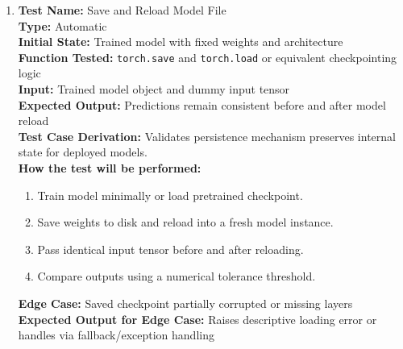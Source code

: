 \documentclass[12pt, titlepage]{article}
\begin{document}
\begin{enumerate}
  \item \textbf{Test Name:} Save and Reload Model File\\
  \textbf{Type:} Automatic\\
  \textbf{Initial State:} Trained model with fixed weights and architecture\\
  \textbf{Function Tested:} \verb|torch.save| and \verb|torch.load| or equivalent checkpointing logic\\
  \textbf{Input:} Trained model object and dummy input tensor\\
  \textbf{Expected Output:} Predictions remain consistent before and after model reload\\
  \textbf{Test Case Derivation:} Validates persistence mechanism preserves internal state for deployed models.\\
  \textbf{How the test will be performed:}
  \begin{enumerate}
    \item Train model minimally or load pretrained checkpoint.
    \item Save weights to disk and reload into a fresh model instance.
    \item Pass identical input tensor before and after reloading.
    \item Compare outputs using a numerical tolerance threshold.
  \end{enumerate}
  \textbf{Edge Case:} Saved checkpoint partially corrupted or missing layers\\
  \textbf{Expected Output for Edge Case:} Raises descriptive loading error or handles via fallback/exception handling\\
  \vspace{1em}


\end{enumerate}
\end{document}
